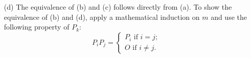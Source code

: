 \begin{sol}
\begin{itemize}
  \item[(d)]
    The equivalence of (b) and (c) follows directly from (a).
    To show the equivalence of (b) and (d),
    apply a mathematical induction on $m$ and
    use the following property of $P_k$:
    \begin{displaymath}
      P_iP_j =
      \begin{cases}
        P_i \text{ if } i = j; \\
        O \text{ if } i\neq j.
      \end{cases}
    \end{displaymath}
  \end{itemize}
\end{sol}
